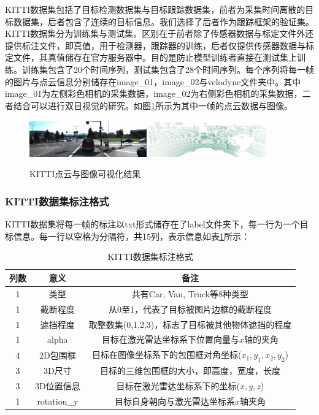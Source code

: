 KITTI数据集包括了目标检测数据集与目标跟踪数据集，前者为采集时间离散的目标数据集，后者包含了连续的目标信息。我们选择了后者作为跟踪框架的验证集。KITTI数据集分为训练集与测试集。区别在于前者除了传感器数据与标定文件外还提供标注文件，即真值，用于检测器，跟踪器的训练，后者仅提供传感器数据与标定文件，其真值储存在官方服务器中。目的是防止模型训练者直接在测试集上训练。训练集包含了20个时间序列，测试集包含了28个时间序列。每个序列将每一帧的图片与点云信息分别储存在image\_01，image\_02与velodyne文件夹中。其中image\_01为左侧彩色相机的采集数据，image\_02为右侧彩色相机的采集数据，二者结合可以进行双目视觉的研究。如图\ref{fig15}所示为其中一帧的点云数据与图像。

\begin{figure}[htb] 
    \center
    \includegraphics[width=0.45\textwidth]{figure/fig15.png}
    \includegraphics[width=0.45\textwidth]{figure/fig16.png}
    \caption{KITTI点云与图像可视化结果}
    \label{fig15}
\end{figure}

\subsubsection{KITTI数据集标注格式}

KITTI数据集将每一帧的标注以txt形式储存在了label文件夹下，每一行为一个目标信息。每一行以空格为分隔符，共15列，表示信息如表\ref{table2}所示：

\begin{table}[htbp]
    \centering
    \caption{KITTI数据集标注格式}
    \begin{tabular}{c c c}
    \toprule
    列数 & 意义 & 备注 \\
    \midrule
    1 & 类型 & 共有Car, Van, Truck等8种类型\\
    1 & 截断程度 & 从0至1，代表了目标被图片边框的截断程度\\
    1 & 遮挡程度 & 取整数集(0,1,2,3)，标志了目标被其他物体遮挡的程度\\
    1 & alpha & 目标在激光雷达坐标系下位置向量与$x$轴的夹角\\
    4 & 2D包围框 & 目标在图像坐标系下的包围框对角坐标($x_1, y_1, x_2, y_2$)\\
    3 & 3D尺寸 & 目标的三维包围框的大小，即高度，宽度，长度\\
    3 & 3D位置信息 & 目标在激光雷达坐标系下的坐标($x,y,z$)\\
    1 & rotation\_y & 目标自身朝向与激光雷达坐标系$x$轴夹角\\
    \bottomrule
    \end{tabular}
    \label{table2}
\end{table}

